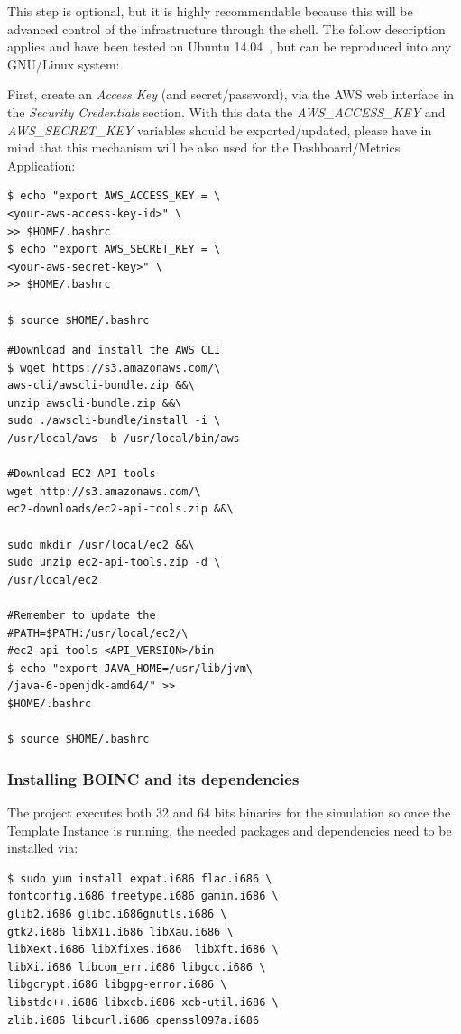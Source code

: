 \documentclass[journal abbreviation, manuscript]{copernicus}
\begin{document}
This step is optional, but it is highly recommendable because this will be advanced control of the infrastructure through the shell.
The follow description applies and have been tested on Ubuntu 14.04~\cite{ubuntu}, but can be reproduced into any GNU/Linux system:

First, create an \textit{Access Key} (and secret/password), via the AWS web interface in the \textit{Security Credentials} section. With this data the \textit{AWS\_ACCESS\_KEY} and
\textit{AWS\_SECRET\_KEY} variables should be exported/updated, please have in mind that this mechanism will be also used for the Dashboard/Metrics Application:

\begin{verbatim}
$ echo "export AWS_ACCESS_KEY = \
<your-aws-access-key-id>" \
>> $HOME/.bashrc
$ echo "export AWS_SECRET_KEY = \
<your-aws-secret-key>" \
>> $HOME/.bashrc

$ source $HOME/.bashrc
\end{verbatim}

\begin{verbatim}
#Download and install the AWS CLI
$ wget https://s3.amazonaws.com/\
aws-cli/awscli-bundle.zip &&\
unzip awscli-bundle.zip &&\
sudo ./awscli-bundle/install -i \
/usr/local/aws -b /usr/local/bin/aws

#Download EC2 API tools
wget http://s3.amazonaws.com/\
ec2-downloads/ec2-api-tools.zip &&\

sudo mkdir /usr/local/ec2 &&\
sudo unzip ec2-api-tools.zip -d \
/usr/local/ec2

#Remember to update the
#PATH=$PATH:/usr/local/ec2/\
#ec2-api-tools-<API_VERSION>/bin
$ echo "export JAVA_HOME=/usr/lib/jvm\
/java-6-openjdk-amd64/" >>
$HOME/.bashrc

$ source $HOME/.bashrc
\end{verbatim}

\subsubsection{Installing BOINC and its dependencies}

The project executes both 32 and 64 bits binaries for the simulation so once the Template Instance is running, the needed packages and dependencies need to be installed via:

\begin{verbatim}
$ sudo yum install expat.i686 flac.i686 \
fontconfig.i686 freetype.i686 gamin.i686 \
glib2.i686 glibc.i686gnutls.i686 \
gtk2.i686 libX11.i686 libXau.i686 \
libXext.i686 libXfixes.i686  libXft.i686 \
libXi.i686 libcom_err.i686 libgcc.i686 \
libgcrypt.i686 libgpg-error.i686 \
libstdc++.i686 libxcb.i686 xcb-util.i686 \
zlib.i686 libcurl.i686 openssl097a.i686
\end{verbatim}
\end{document}
